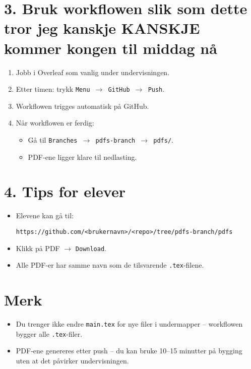 \documentclass[a4paper,12pt]{article}
\begin{document}
\section*{3. Bruk workflowen slik som dette tror jeg kanskje KANSKJE kommer kongen til middag nå}
\begin{enumerate}[label=\arabic*.]
    \item Jobb i Overleaf som vanlig under undervisningen.
    \item Etter timen: trykk \texttt{Menu $\to$ GitHub $\to$ Push}.
    \item Workflowen trigges automatisk på GitHub.
    \item Når workflowen er ferdig:
    \begin{itemize}
        \item Gå til \texttt{Branches $\to$ pdfs-branch $\to$ pdfs/}.
        \item PDF-ene ligger klare til nedlasting.
    \end{itemize}
\end{enumerate}

\section*{4. Tips for elever}
\begin{itemize}
    \item Elevene kan gå til:
    \begin{verbatim}
https://github.com/<brukernavn>/<repo>/tree/pdfs-branch/pdfs
    \end{verbatim}
    \item Klikk på PDF $\to$ \texttt{Download}.
    \item Alle PDF-er har samme navn som de tilsvarende \texttt{.tex}-filene.
\end{itemize}

\section*{Merk}
\begin{itemize}
    \item Du trenger ikke endre \texttt{main.tex} for nye filer i undermapper – workflowen bygger alle \texttt{.tex}-filer.
    \item PDF-ene genereres etter push – du kan bruke 10--15 minutter på bygging uten at det påvirker undervisningen.
\end{itemize}
\end{document}
